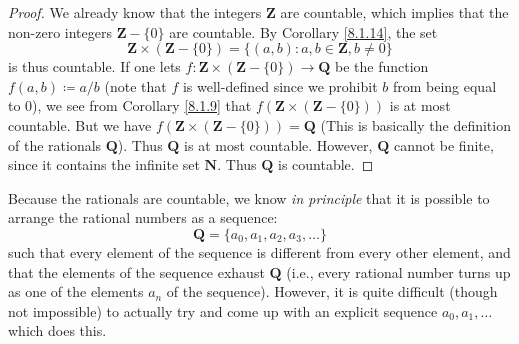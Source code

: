 \begin{proof}
We already know that the integers \(\mathbf{Z}\) are countable, which implies that the non-zero integers \(\mathbf{Z} - \{0\}\) are countable.
By Corollary \ref{8.1.14}, the set
\[
    \mathbf{Z} \times (\mathbf{Z} - \{0\}) = \{(a, b) : a, b \in \mathbf{Z}, b \neq 0\}
\]
is thus countable.
If one lets \(f : \mathbf{Z} \times (\mathbf{Z} - \{0\}) \to \mathbf{Q}\) be the function \(f(a, b) \coloneqq a / b\)
(note that \(f\) is well-defined since we prohibit \(b\) from being equal to \(0\)), we see from Corollary \ref{8.1.9} that \(f(\mathbf{Z} \times (\mathbf{Z} - \{0\}))\) is at most countable.
But we have \(f(\mathbf{Z} \times (\mathbf{Z} - \{0\})) = \mathbf{Q}\)
(This is basically the definition of the rationals \(\mathbf{Q}\)).
Thus \(\mathbf{Q}\) is at most countable.
However, \(\mathbf{Q}\) cannot be finite, since it contains the infinite set \(\mathbf{N}\).
Thus \(\mathbf{Q}\) is countable.
\end{proof}

\begin{remark}\label{8.1.16}
Because the rationals are countable, we know \emph{in principle} that it is possible to arrange the rational numbers as a sequence:
\[
    \mathbf{Q} = \{a_0, a_1, a_2, a_3, \dots\}
\]
such that every element of the sequence is different from every other element, and that the elements of the sequence exhaust \(\mathbf{Q}\)
(i.e., every rational number turns up as one of the elements \(a_n\) of the sequence).
However, it is quite difficult (though not impossible) to actually try and come up with an explicit sequence \(a_0, a_1, \dots\) which does this.
\end{remark}